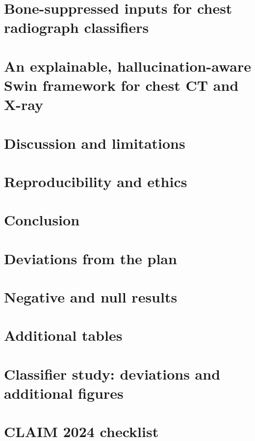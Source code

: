 \documentclass[11pt,a4paper,openany]{report}
\begin{document}
\chapter{Bone-suppressed inputs for chest radiograph classifiers}\label{ch:classifier}


\chapter{An explainable, hallucination-aware Swin framework for chest CT and X-ray}\label{ch:crossmodal}


\chapter{Discussion and limitations}\label{ch:discussion}


\chapter{Reproducibility and ethics}\label{ch:ethics}


\chapter{Conclusion}\label{ch:conclusion}


\appendix
\chapter{Deviations from the plan}\label{app:deviations}


\chapter{Negative and null results}\label{app:negative}


\chapter{Additional tables}\label{app:extra}


\chapter{Classifier study: deviations and additional figures}\label{app:classifier}


\chapter{CLAIM 2024 checklist}\label{app:claim}




\end{document}
